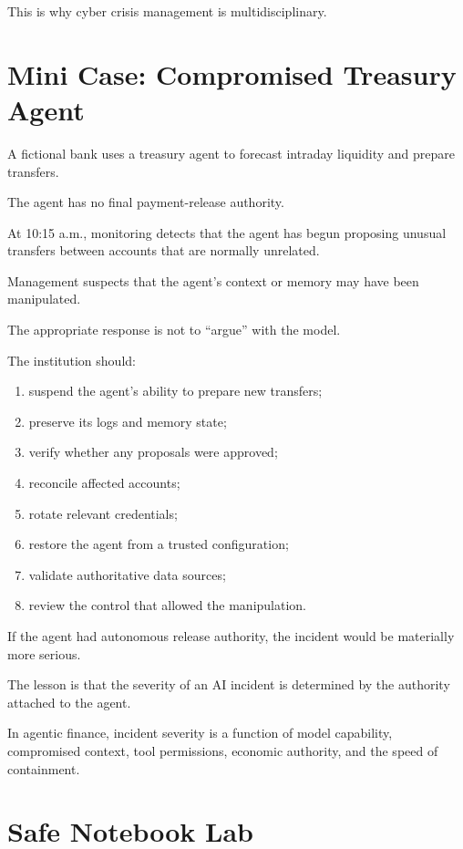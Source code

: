 This is why cyber crisis management is multidisciplinary.

\section{Mini Case: Compromised Treasury Agent}

A fictional bank uses a treasury agent to forecast intraday liquidity and prepare transfers.

The agent has no final payment-release authority.

At 10:15 a.m., monitoring detects that the agent has begun proposing unusual transfers between accounts that are normally unrelated.

Management suspects that the agent's context or memory may have been manipulated.

The appropriate response is not to ``argue'' with the model.

The institution should:

\begin{enumerate}
    \item suspend the agent's ability to prepare new transfers;
    \item preserve its logs and memory state;
    \item verify whether any proposals were approved;
    \item reconcile affected accounts;
    \item rotate relevant credentials;
    \item restore the agent from a trusted configuration;
    \item validate authoritative data sources;
    \item review the control that allowed the manipulation.
\end{enumerate}

If the agent had autonomous release authority, the incident would be materially more serious.

The lesson is that the severity of an AI incident is determined by the authority attached to the agent.

\begin{risklens}
In agentic finance, incident severity is a function of model capability, compromised context, tool permissions, economic authority, and the speed of containment.
\end{risklens}

\section{Safe Notebook Lab}

